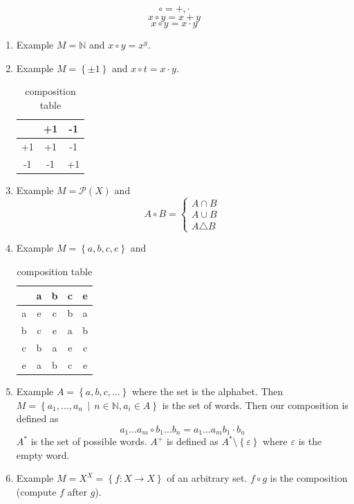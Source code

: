 \documentclass[a4paper,landscape,twocolumn]{article}
\newcommand\set[1]{\left\{#1\right\}}
\newcommand\setdef[2]{\left\{#1\,\middle|\,#2\right\}}
\begin{document}
\[ \circ = +, \cdot \]
\[ x \circ y = x + y \]
\[ x \circ y = x \cdot y \]

\begin{enumerate}
  \item Example $M = \mathbb{N}$ and $x \circ y = x^y$.
  \item Example $M = \set{\pm 1}$ and $x \circ t = x \cdot y$.

    \begin{table}[!ht]
      \begin{center}
        \begin{tabular}{c|cc}
         & +1 & -1 \\
        \hline
          +1 & +1 & -1 \\
          -1 & -1 & +1
        \end{tabular}
        \caption{composition table}
      \end{center}
    \end{table}

  \item Example $M = \mathcal{P}(X)$ and
    \[
      A \circ B =
      \begin{cases}
        A \cap B \\
        A \cup B \\
        A \triangle B
      \end{cases}
    \]

  \item Example $M = \set{a, b, c, e}$ and

    \begin{table}[!ht]
      \begin{center}
        \begin{tabular}{c|cccc}
            & a & b & c & e \\
         \hline
          a & e & c & b & a \\
          b & c & e & a & b \\
          c & b & a & e & c \\
          e & a & b & c & e \\
        \end{tabular}
        \caption{composition table}
      \end{center}
    \end{table}

  \item
    Example $A = \set{a, b, c, \dots}$ where the set is the alphabet.
    Then $M = \setdef{a_1, \ldots, a_n}{n \in \mathbb{N}, a_i \in A}$ is the set of words.
    Then our composition is defined as
    \[ a_1 \ldots a_m \circ b_1 \ldots b_n = a_1 \ldots a_m b_1 \cdot b_n \]
    $A^*$ is the set of possible words.
    $A^+$ is defined as $A^* \setminus \set{\varepsilon}$ where $\varepsilon$ is the empty word.

  \item
    Example $M = X^X = \set{f: X \rightarrow X}$ of an arbitrary set. $f \circ g$ is the composition (compute $f$ after $g$).
\end{enumerate}
\end{document}
